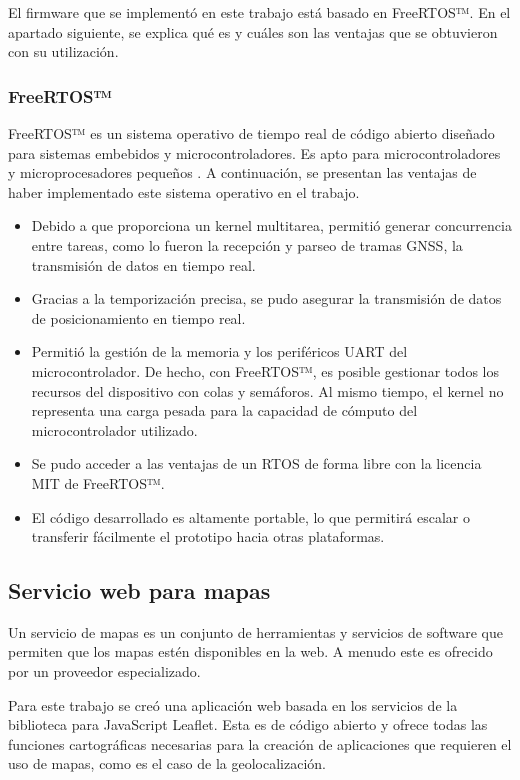 El firmware que se implementó en este trabajo está basado en FreeRTOS™. En el apartado siguiente, se explica qué es y cuáles son las ventajas que se obtuvieron con su utilización. 

\subsubsection{FreeRTOS™}
\label{sec:FreeRTOS}

FreeRTOS™ es un sistema operativo de tiempo real de código abierto diseñado para sistemas embebidos y microcontroladores. Es apto para microcontroladores y microprocesadores pequeños \citep{FreeRTOS}. A continuación, se presentan las ventajas de haber implementado este sistema operativo en el trabajo.

\begin{itemize}
    \item Debido a que proporciona un kernel multitarea, permitió generar concurrencia entre tareas, como lo fueron la recepción y parseo de tramas GNSS, la transmisión de datos en tiempo real.  
    \item Gracias a la temporización precisa, se pudo asegurar la transmisión de datos de posicionamiento en tiempo real. 
    \item Permitió la gestión de la memoria y los periféricos UART del microcontrolador. De hecho, con FreeRTOS™, es posible gestionar todos los recursos del dispositivo con colas y semáforos. Al mismo tiempo, el kernel no representa una carga pesada para la capacidad de cómputo del microcontrolador utilizado. 
    \item Se pudo acceder a las ventajas de un RTOS de forma libre con la licencia MIT de FreeRTOS™.
    \item El código desarrollado es altamente portable, lo que permitirá escalar o transferir fácilmente el prototipo hacia otras plataformas. 
\end{itemize}



\subsection{Servicio web para mapas}
\label{sec:mapas_web}

Un servicio de mapas es un conjunto de herramientas y servicios de software que permiten que los mapas estén disponibles en la web. A menudo este es ofrecido por un proveedor especializado. 

Para este trabajo se creó una aplicación web basada en los servicios de la biblioteca para JavaScript Leaflet. Esta es de código abierto y ofrece todas las funciones cartográficas necesarias para la creación de aplicaciones que requieren el uso de mapas, como es el caso de la geolocalización.

